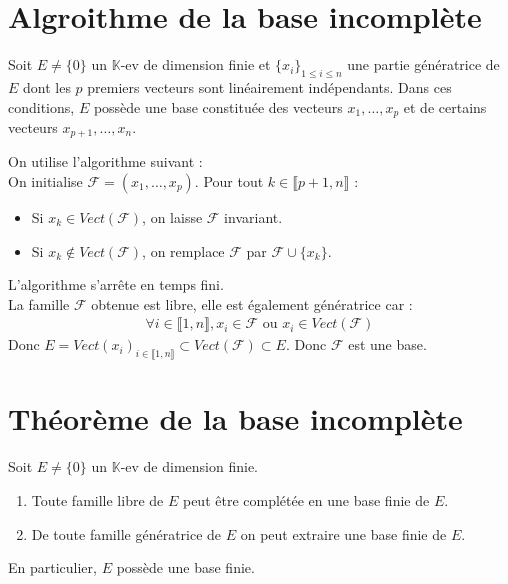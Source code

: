 \documentclass[../main.tex]{subfiles}
\begin{document}
\section{Algroithme de la base incomplète}
\begin{tcolorbox}[title=Théorème 22.5, title filled=false, colframe=orange, colback=orange!10!white]
    Soit $E \neq \{0\}$ un $\mathbb{K}$-ev de dimension finie et $\{x_i\}_{1\leq i\leq n}$ une partie génératrice de $E$ dont les $p$ premiers vecteurs sont linéairement indépendants. Dans ces conditions, $E$ possède une base constituée des vecteurs $x_1, \ldots, x_p$ et de certains vecteurs $x_{p+1}, \ldots, x_n$. 
\end{tcolorbox}

\noindent On utilise l'algorithme suivant : \\
On initialise $\mathcal{F} = (x_1, \ldots, x_p)$. Pour tout $k \in \llbracket p+1, n \rrbracket$ : 
\begin{itemize}
    \item Si $x_k \in Vect(\mathcal{F})$, on laisse $\mathcal{F}$ invariant. 
    \item Si $x_k \not\in Vect(\mathcal{F})$, on remplace $\mathcal{F}$ par $\mathcal{F} \cup \{x_k\}$.
\end{itemize}
L'algorithme s'arrête en temps fini. \\
La famille $\mathcal{F}$ obtenue est libre, elle est également génératrice car : 
\begin{align*}
    \forall i \in \llbracket 1, n \rrbracket, x_i \in \mathcal{F} \text{ ou } x_i \in Vect(\mathcal{F})
\end{align*}
Donc $E = Vect(x_i)_{i\in \llbracket 1, n \rrbracket} \subset Vect(\mathcal{F}) \subset E$.
Donc $\mathcal{F}$ est une base. 

\section{Théorème de la base incomplète}
\begin{tcolorbox}[title=Théorème 22.8, title filled=false, colframe=orange, colback=orange!10!white]
    Soit $E\neq \{0\}$ un $\mathbb{K}$-ev de dimension finie. 
    \begin{enumerate}
        \item Toute famille libre de $E$ peut être complétée en une base finie de $E$. 
        \item De toute famille génératrice de $E$ on peut extraire une base finie de $E$. 
    \end{enumerate}
    En particulier, $E$ possède une base finie. 
\end{tcolorbox}
\end{document}
